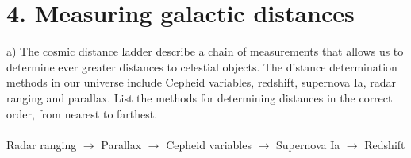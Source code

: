 \section*{4. Measuring galactic distances}

a) The cosmic distance ladder describe a chain of measurements that allows us to determine ever greater
distances to celestial objects. The distance determination methods in our universe include Cepheid 
variables, redshift, supernova Ia, radar ranging and parallax. List the methods for determining distances
in the correct order, from nearest to farthest.\\
\\
Radar ranging $\longrightarrow$ Parallax $\longrightarrow$ Cepheid variables $\longrightarrow$ Supernova 
Ia $\longrightarrow$ Redshift
